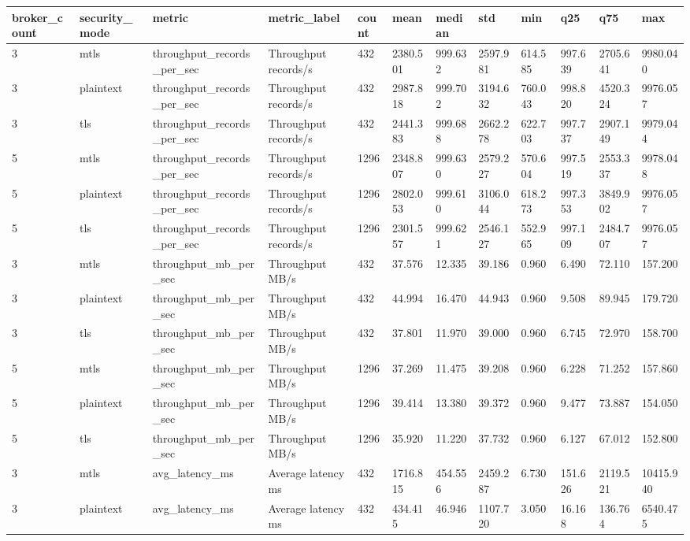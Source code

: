 \begin{longtable}{llllllllllll}
\hline
broker\_count & security\_mode & metric & metric\_label & count & mean & median & std & min & q25 & q75 & max \\
\hline
3 & mtls & throughput\_records\_per\_sec & Throughput records/s & 432 & 2380.501 & 999.632 & 2597.981 & 614.585 & 997.639 & 2705.641 & 9980.040 \\
3 & plaintext & throughput\_records\_per\_sec & Throughput records/s & 432 & 2987.818 & 999.702 & 3194.632 & 760.043 & 998.820 & 4520.324 & 9976.057 \\
3 & tls & throughput\_records\_per\_sec & Throughput records/s & 432 & 2441.383 & 999.688 & 2662.278 & 622.703 & 997.737 & 2907.149 & 9979.044 \\
5 & mtls & throughput\_records\_per\_sec & Throughput records/s & 1296 & 2348.807 & 999.630 & 2579.227 & 570.604 & 997.519 & 2553.337 & 9978.048 \\
5 & plaintext & throughput\_records\_per\_sec & Throughput records/s & 1296 & 2802.053 & 999.610 & 3106.044 & 618.273 & 997.353 & 3849.902 & 9976.057 \\
5 & tls & throughput\_records\_per\_sec & Throughput records/s & 1296 & 2301.557 & 999.621 & 2546.127 & 552.965 & 997.109 & 2484.707 & 9976.057 \\
3 & mtls & throughput\_mb\_per\_sec & Throughput MB/s & 432 & 37.576 & 12.335 & 39.186 & 0.960 & 6.490 & 72.110 & 157.200 \\
3 & plaintext & throughput\_mb\_per\_sec & Throughput MB/s & 432 & 44.994 & 16.470 & 44.943 & 0.960 & 9.508 & 89.945 & 179.720 \\
3 & tls & throughput\_mb\_per\_sec & Throughput MB/s & 432 & 37.801 & 11.970 & 39.000 & 0.960 & 6.745 & 72.970 & 158.700 \\
5 & mtls & throughput\_mb\_per\_sec & Throughput MB/s & 1296 & 37.269 & 11.475 & 39.208 & 0.960 & 6.228 & 71.252 & 157.860 \\
5 & plaintext & throughput\_mb\_per\_sec & Throughput MB/s & 1296 & 39.414 & 13.380 & 39.372 & 0.960 & 9.477 & 73.887 & 154.050 \\
5 & tls & throughput\_mb\_per\_sec & Throughput MB/s & 1296 & 35.920 & 11.220 & 37.732 & 0.960 & 6.127 & 67.012 & 152.800 \\
3 & mtls & avg\_latency\_ms & Average latency ms & 432 & 1716.815 & 454.556 & 2459.287 & 6.730 & 151.626 & 2119.521 & 10415.940 \\
3 & plaintext & avg\_latency\_ms & Average latency ms & 432 & 434.415 & 46.946 & 1107.720 & 3.050 & 16.168 & 136.764 & 6540.475 \\

\end{longtable}
